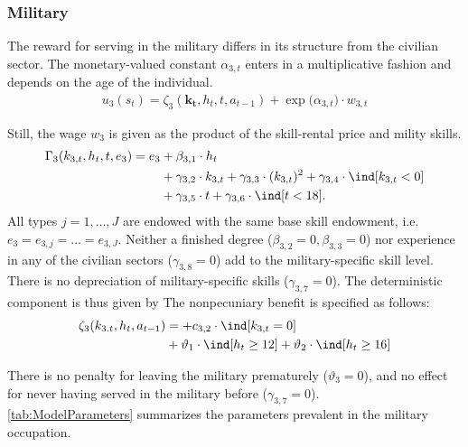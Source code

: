 \FloatBarrier\subsubsection{Military}
The reward for serving in the military differs in its structure from the civilian sector. The monetary-valued constant $\alpha_{3,t}$ enters in a multiplicative fashion and depends on the age of the individual.
%
\begin{align}\label{eq:RewardMilitary}
    u_{3}(s_t) = \zeta_3(\bm{k_t}, h_t, t , a_{t -1})  + \exp \big( \alpha_{3, t} \big) \cdot w_{3,t}
\end{align}

Still, the wage $w_{3}$ is given as the product of the skill-rental price and mility skills.
%
\begin{align}
    \Gamma_3( k_{3,t}, h_t, t, e_3) = e_3 & + \beta_{3,1} \cdot h_t \nonumber \\
	               \nonumber &+ \gamma_{3,2} \cdot  k_{3,t} + \gamma_{3,3} \cdot (k_{3,t})^2 + \gamma_{3,4} \cdot \ind[k_{3,t} < 0] \\
									 & + \gamma_{3,5} \cdot t + \gamma_{3,6} \cdot \ind[t < 18].
\end{align}
%
All types $j = 1, \dots, J$ are endowed with the same base skill endowment, i.e. $e_3 = e_{3,j} = \dots = e_{3, J}$. Neither a finished degree ($\beta_{3,2} = 0, \beta_{3,3} = 0$) nor experience in any of the civilian sectors ($\gamma_{3,8} = 0$) add to the military-specific skill level. There is no depreciation of military-specific skills ($\gamma_{3,7} = 0$). The deterministic component is thus given by
%
The nonpecuniary benefit is specified as follows:
%
\begin{align*}
\zeta_{3}( k_{3.t}, h_t, a_{t-1} )  & =   + c_{3,2} \cdot \ind[k_{3,t} = 0] \nonumber \\
  & + \vartheta_1 \cdot \ind[h_t \geq 12] + \vartheta_2 \cdot \ind[h_t \geq 16]
\end{align*}

There is no penalty for leaving the military prematurely ($\vartheta_3 = 0$), and no effect for never having served in the military before ($\gamma_{3,7} = 0$).\\

\autoref{tab:ModelParameters} summarizes the parameters prevalent in the military occupation.



